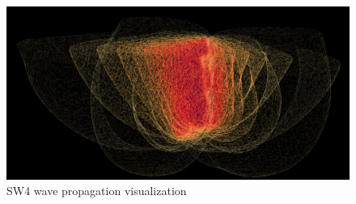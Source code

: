 \begin{figure}[t]
\centering
\includegraphics[width=0.8\linewidth]{images/sw4_waves.png}
\caption{SW4 wave propagation visualization}
\label{fig:sw4_vis}
\end{figure}


